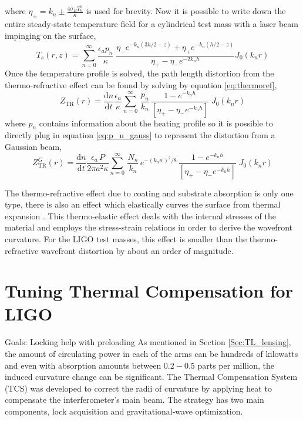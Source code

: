 	where $\eta_{\pm} = k_n \pm \frac{4\sigma_B T_0^3}{\kappa}$ is used for brevity. Now it is possible to write down the entire steady-state temperature field for a cylindrical test mass with a laser beam impinging on the surface,
	\begin{equation}
	T_s(r,z) = \sum_{n=0}^{\infty} \frac{\epsilon_a p_n}{\kappa}  \; \frac{ \eta_{-}e^{-k_n(3h/2-z)} + \eta_{+}e^{-k_n(h/2-z)}  }{\eta_{+} - \eta_{-} e^{-2k_n h} } J_0(k_n r)
	\end{equation} 
	Once the temperature profile is solved, the path length distortion from the thermo-refractive effect can be found by solving by equation \ref{eq:thermoref},
	\begin{equation}
	Z_{\text{TR}}(r) = \frac{\text{d}n}{\text{d}t} \frac{\epsilon_a}{\kappa} \sum_{n=0}^{\infty} \, \frac{p_n}{k_n} \, \frac{1- e^{-k_n h}}{[\eta_{+} - \eta_{-} e^{-k_nh}]} \; J_0(k_n r) 
	\end{equation}
	where $p_n$ contains information about the heating profile so it is possible to directly plug in equation \ref{eq:p_n_gauss} to represent the distortion from a Gaussian beam,
	\begin{equation}
	Z_{\text{TR}}^{G}(r) =  \frac{\text{d}n}{\text{d}t} \frac{\epsilon_a \, P}{2\pi a^2 \kappa} \sum_{n=0}^{\infty} \, \frac{N_n}{k_n}\, e^{-(k_n w)^2/8} \, \frac{1- e^{-k_n h}}{[\eta_{+} - \eta_{-} e^{-k_nh}]} \; J_0(k_n r) 
	\end{equation}

	The thermo-refractive effect due to coating and substrate absorption is only one type, there is also an effect which elastically curves the surface from thermal expansion \cite{Vinet_Thermal_Issues}.  This thermo-elastic effect deals with the internal stresses of the material and employs the stress-strain relations in order to derive the wavefront curvature.  For the LIGO test masses, this effect is smaller than the thermo-refractive wavefront distortion by about an order of magnitude.
	
	\section{Tuning Thermal Compensation for LIGO}
	Goals: Locking help with preloading \cite{Lawrence_TCS} \cite{AWC_current} \cite{winkler_thermaldist} \cite{Strain_TL}
	As mentioned in Section \ref{Sec:TL_lensing}, the amount of circulating power in each of the arms can be hundreds of kilowatts and even with absorption amounts between $0.2-0.5$ parts per million, the induced curvature change can be significant.  The Thermal Compensation System (TCS) was developed to correct the radii of curvature by applying heat to compensate the interferometer's main beam.  The strategy has two main components, lock acquisition and gravitational-wave optimization.
	
